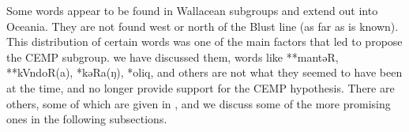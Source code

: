 Some words appear to be found in Wallacean subgroups
and extend out into Oceania.
They are not found west or north of the Blust line (as far as is known).
This distribution of certain words was one of the main factors
that led \citet{Blust1982,Blust1993,Blust2009,Blust2012b} to propose the CEMP subgroup.
 we have discussed them,
words like **mantəR, **kVndoR(a),
*kəRa(ŋ), *oliq, and others are not what they seemed to have
been at the time,
and no longer provide support for the CEMP hypothesis.
There are others, some of which are given in ,
and we discuss some of the more promising ones in the following
subsections.